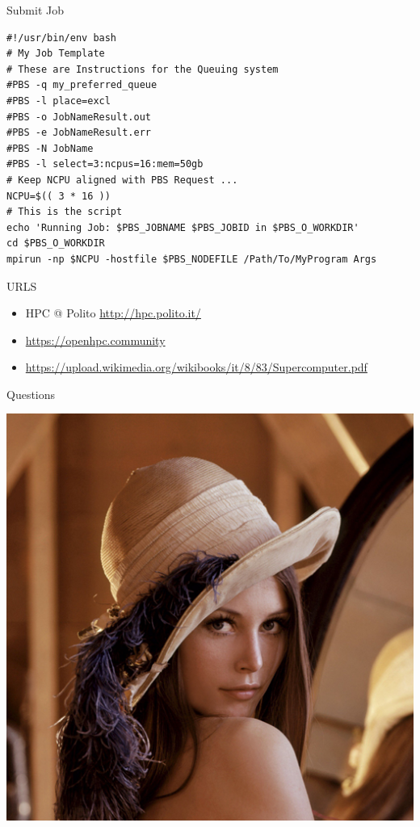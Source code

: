 \documentclass[ignorenonframetext,]{beamer}
\providecommand{\tightlist}{%
  \setlength{\itemsep}{0pt}\setlength{\parskip}{0pt}}
\begin{document}
\begin{frame}[fragile]{Submit Job}

\begin{verbatim}
#!/usr/bin/env bash
# My Job Template
# These are Instructions for the Queuing system
#PBS -q my_preferred_queue
#PBS -l place=excl
#PBS -o JobNameResult.out
#PBS -e JobNameResult.err
#PBS -N JobName
#PBS -l select=3:ncpus=16:mem=50gb
# Keep NCPU aligned with PBS Request ...
NCPU=$(( 3 * 16 ))
# This is the script
echo 'Running Job: $PBS_JOBNAME $PBS_JOBID in $PBS_O_WORKDIR'
cd $PBS_O_WORKDIR
mpirun -np $NCPU -hostfile $PBS_NODEFILE /Path/To/MyProgram Args
\end{verbatim}

\end{frame}

\begin{frame}{URLS}

\begin{itemize}
\tightlist
\item
  HPC @ Polito \url{http://hpc.polito.it/}
\end{itemize}


\begin{itemize}
\tightlist
\item
  \url{https://openhpc.community}
\item
  \url{https://upload.wikimedia.org/wikibooks/it/8/83/Supercomputer.pdf}
\end{itemize}


\end{frame}

\begin{frame}{Questions}

\includegraphics{images/Lenna-Q1.png}

\end{frame}
\end{document}
